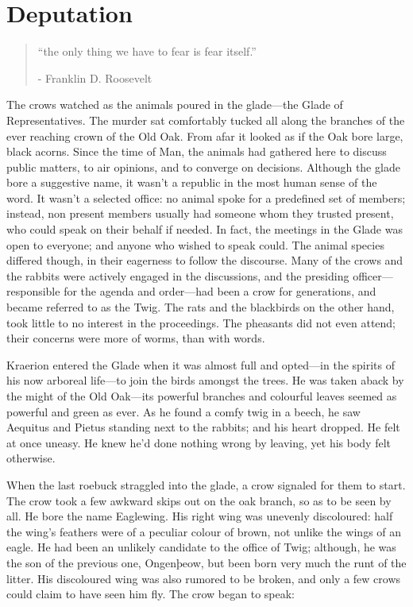 \chapter{Deputation}

\vspace{-1.3cm}
\begin{localsize}{10}
	\begin{quote}
		“the only thing we have to fear is fear itself.”
		\begin{flushright}- Franklin D. Roosevelt \end{flushright}
	\end{quote} 
\end{localsize}
\vspace{1cm}

The crows watched as the animals poured in the glade---the Glade of Representatives. The murder sat comfortably tucked all along the branches of the ever reaching crown of the Old Oak. From afar it looked as if the Oak bore large, black acorns. Since the time of Man, the animals had gathered here to discuss public matters, to air opinions, and to converge on decisions. Although the glade bore a suggestive name, it wasn't a republic in the most human sense of the word. It wasn't a selected office: no animal spoke for a predefined set of members; instead, non present members usually had someone whom they trusted present, who could speak on their behalf if needed. In fact, the meetings in the Glade was open to everyone; and anyone who wished to speak could. The animal species differed though, in their eagerness to follow the discourse. Many of the crows and the rabbits were actively engaged in the discussions, and the presiding officer---responsible for the agenda and order---had been a crow for generations, and became referred to as the Twig. The rats and the blackbirds on the other hand, took little to no interest in the proceedings. The pheasants did not even attend; their concerns were more of worms, than with words.

Kraerion entered the Glade when it was almost full and opted---in the spirits of his now arboreal life---to join the birds amongst the trees. He was taken aback by the might of the Old Oak---its powerful branches and colourful leaves seemed as powerful and green as ever. As he found a comfy twig in a beech, he saw Aequitus and Pietus standing next to the rabbits; and his heart dropped. He felt at once uneasy. He knew he'd done nothing wrong by leaving, yet his body felt otherwise.

When the last roebuck straggled into the glade, a crow signaled for them to start. The crow took a few awkward skips out on the oak branch, so as to be seen by all. He bore the name Eaglewing. His right wing was unevenly discoloured: half the wing's feathers were of a peculiar colour of brown, not unlike the wings of an eagle. He had been an unlikely candidate to the office of Twig; although, he was the son of the previous one, Ongenþeow, but been born very much the runt of the litter. His discoloured wing was also rumored to be broken, and only a few crows could claim to have seen him fly. The crow began to speak:

